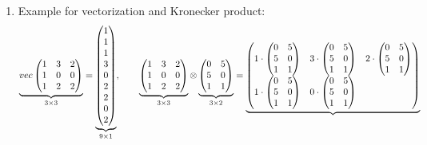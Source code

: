 \begin{enumerate}
\item Example for vectorization and Kronecker product:
\begin{align*}
\underbrace{vec
  \begin{pmatrix}
  1&3&2\\
  1&0&0\\
  1&2&2
  \end{pmatrix}
}_{3\times3}
=
\underbrace{%
  \begin{pmatrix}1 \\1 \\1 \\3 \\0 \\2 \\2 \\ 0 \\2\end{pmatrix}
}_{9\times1}
,\qquad 
\underbrace{%
  \begin{pmatrix}
  1&3&2\\
  1&0&0\\
  1&2&2
  \end{pmatrix}
}_{3\times3}
\otimes
\underbrace{%
  \begin{pmatrix}
  0&5\\
  5&0\\
  1&1
  \end{pmatrix}
}_{3\times2}
=
\underbrace{%
  \begin{pmatrix}
  1 \cdot \begin{pmatrix} 0 & 5 \\ 5 & 0 \\ 1 & 1 \end{pmatrix} &
  3 \cdot \begin{pmatrix} 0 & 5 \\ 5 & 0 \\ 1 & 1 \end{pmatrix} &
  2 \cdot \begin{pmatrix} 0 & 5 \\ 5 & 0 \\ 1 & 1 \end{pmatrix}
  \\
  1 \cdot \begin{pmatrix} 0 & 5 \\ 5 & 0 \\ 1 & 1 \end{pmatrix} &
  0 \cdot \begin{pmatrix} 0 & 5 \\ 5 & 0 \\ 1 & 1 \end{pmatrix} &

\end{pmatrix}}
\end{align*}
\end{enumerate}
